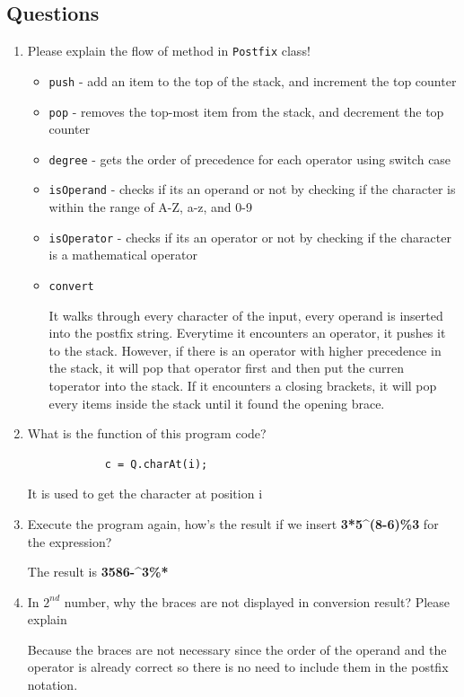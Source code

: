\documentclass[12pt,titlepage]{article}
\begin{document}
\subsection{Questions}
\begin{enumerate}
    \item {
        Please explain the flow of method in \texttt{Postfix} class!
        
        \begin{itemize}
            \item \texttt{push} - add an item to the top of the stack, and increment the top counter
            \item \texttt{pop} - removes the top-most item from the stack, and decrement the top counter
            \item \texttt{degree} - gets the order of precedence for each operator using switch case
            \item \texttt{isOperand} - checks if its an operand or not by checking if the character is within the range of A-Z, a-z, and 0-9
            \item \texttt{isOperator} - checks if its an operator or not by checking if the character is a mathematical operator
            \item {
                \texttt{convert}
                
                It walks through every character of the input, every operand is inserted into the postfix string. 
                Everytime it encounters an operator, it pushes it to the stack.
                However, if there is an operator with higher precedence in the stack, it will pop that operator first and then put the curren toperator into the stack.
                If it encounters a closing brackets, it will pop every items inside the stack until it found the opening brace.
            }
        \end{itemize}
    }
    \item {
        What is the function of this program code?

        \begin{verbatim}
            c = Q.charAt(i);
        \end{verbatim}

        It is used to get the character at position i
    }
    \item {
        Execute the program again, how's the result if we insert \textbf{3*5\^{}(8-6)\%3} for the expression?

        The result is \textbf{3586-\^{}3\%*}
    }
    \item {
        In $2^{nd}$ number, why the braces are not displayed in conversion result? Please explain

        Because the braces are not necessary since the order of the operand and the operator is already correct so
        there is no need to include them in the postfix notation.
    }
\end{enumerate}
\end{document}
